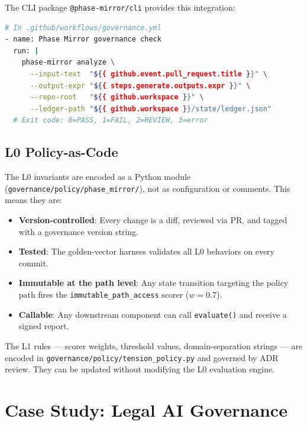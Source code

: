 \documentclass[11pt,letterpaper]{article}
\theoremstyle{remark}
\begin{document}
The CLI package \texttt{@phase-mirror/cli} provides this integration:

\begin{lstlisting}[language=bash, caption={%
  PR check usage of @phase-mirror/cli}]
# In .github/workflows/governance.yml
- name: Phase Mirror governance check
  run: |
    phase-mirror analyze \
      --input-text  "${{ github.event.pull_request.title }}" \
      --output-expr "${{ steps.generate.outputs.expr }}" \
      --repo-root   "${{ github.workspace }}" \
      --ledger-path "${{ github.workspace }}/state/ledger.json"
  # Exit code: 0=PASS, 1=FAIL, 2=REVIEW, 3=error
\end{lstlisting}

\subsection{L0 Policy-as-Code}

The L0 invariants are encoded as a Python module
(\texttt{governance/policy/phase\_mirror/}), not as configuration
or comments.  This means they are:

\begin{itemize}[leftmargin=1.5em]
  \item \textbf{Version-controlled}: Every change is a diff, reviewed
        via PR, and tagged with a governance version string.
  \item \textbf{Tested}: The golden-vector harness validates all L0
        behaviors on every commit.
  \item \textbf{Immutable at the path level}: Any state transition
        targeting the policy path fires the
        \texttt{immutable\_path\_access} scorer ($w = 0.7$).
  \item \textbf{Callable}: Any downstream component can call
        \texttt{evaluate()} and receive a signed report.
\end{itemize}

The L1 rules --- scorer weights, threshold values, domain-separation
strings --- are encoded in \texttt{governance/policy/tension\_policy.py}
and governed by ADR review.  They can be updated without modifying the
L0 evaluation engine.

\section{Case Study: Legal AI Governance}
\label{sec:legal}
\end{document}
